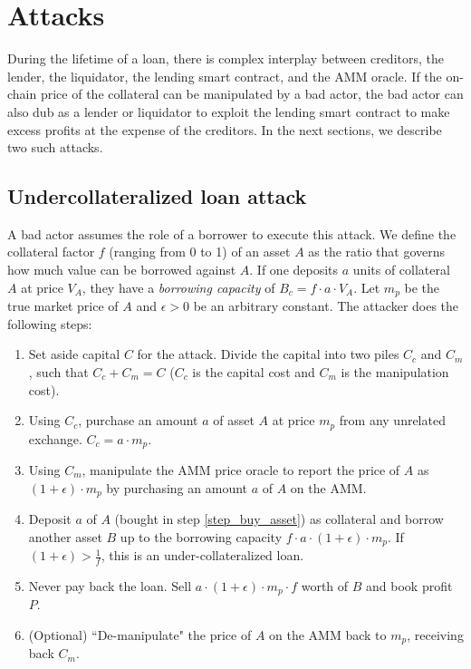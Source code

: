 \documentclass[conference]{IEEEtran}
\begin{document}
\section{Attacks}
During the lifetime of a loan, there is complex interplay between creditors, the lender, the liquidator, the lending smart contract, and the AMM oracle. If the on-chain price of the collateral can be manipulated by a bad actor, the bad actor can also dub as a lender or liquidator to exploit the lending smart contract to make excess profits at the expense of the creditors. In the next sections, we describe two such attacks.

\subsection{Undercollateralized loan attack \label{SectionUndercollAttack}}
A bad actor assumes the role of a borrower to execute this attack. We define the collateral factor $f$ (ranging from 0 to 1) of an asset $A$ as the ratio that governs how much value can be borrowed against $A$. If one deposits $a$ units of collateral $A$ at price $V_A$, they have a \textit{borrowing capacity} of $B_c = f \cdot a \cdot V_A$. Let $m_p$ be the true market price of $A$ and $\epsilon > 0$ be an arbitrary constant. The attacker does the following steps:
\begin{enumerate}
    \item Set aside capital $C$ for the attack. Divide the capital into two piles $C_c$ and $C_m$, such that $C_c + C_m = C$ ($C_c$ is the capital cost and $C_m$ is the manipulation cost). 
    \item \label{step_buy_asset} Using $C_c$, purchase an amount $a$ of asset $A$ at price $m_p$ from any unrelated exchange. $C_c = a \cdot m_p$.
    \item \label{step_manipulate} Using $C_m$, manipulate the AMM price oracle to report the price of $A$ as $(1 + \epsilon) \cdot m_p$ by purchasing an amount $a$ of $A$ on the AMM.
    \item Deposit $a$ of $A$ (bought in step \ref{step_buy_asset}) as collateral and borrow another asset $B$ up to the borrowing capacity $f \cdot a \cdot (1 + \epsilon)\cdot m_p$. If $(1 + \epsilon) > \frac{1}{f}$, this is an under-collateralized loan.
    \item Never pay back the loan. Sell $a \cdot (1 + \epsilon)\cdot m_p \cdot f$ worth of $B$ and book profit $P$.
    \item \label{step_de_manipulate} (Optional) ``De-manipulate" the price of $A$ on the AMM back to $m_p$, receiving back $C_m$.
\end{enumerate}
\end{document}

